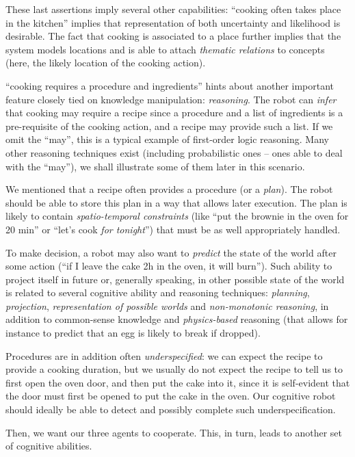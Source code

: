 These last assertions imply several other capabilities: ``cooking often takes
place in the kitchen'' implies that representation of both uncertainty and
likelihood is desirable. The fact that cooking is associated to a place further
implies that the system models locations and is able to attach \emph{thematic
relations} to concepts (here, the likely location of the cooking action).

``cooking requires a procedure and ingredients'' hints about another important
feature closely tied on knowledge manipulation: \emph{reasoning}. The robot can
\emph{infer} that cooking may require a recipe since a procedure and a list of
ingredients is a pre-requisite of the cooking action, and a recipe may provide
such a list.  If we omit the ``may'', this is a typical example of first-order
logic reasoning.  Many other reasoning techniques exist (including
probabilistic ones -- ones able to deal with the ``may''), we shall illustrate
some of them later in this scenario.

We mentioned that a recipe often provides a procedure (or a \emph{plan}). The
robot should be able to store this plan in a way that allows later execution.
The plan is likely to contain \emph{spatio-temporal constraints} (like ``put
the brownie in the oven for 20 min'' or ``let's cook \emph{for tonight}'') that
must be as well appropriately handled.

To make decision, a robot may also want to \emph{predict} the state of the
world after some action (``if I leave the cake 2h in the oven, it will burn'').
Such ability to project itself in future or, generally speaking, in other
possible state of the world is related to several cognitive ability and
reasoning techniques: \emph{planning}, \emph{projection}, \emph{representation
of possible worlds} and \emph{non-monotonic reasoning}, in addition to
common-sense knowledge and \emph{physics-based} reasoning (that allows for
instance to predict that an egg is likely to break if dropped).

Procedures are in addition often \emph{underspecified}: we can expect the
recipe to provide a cooking duration, but we usually do not expect the recipe
to tell us to first open the oven door, and then put the cake into it, since it
is self-evident that the door must first be opened to put the cake in the oven.
Our cognitive robot should ideally be able to detect and possibly complete such
underspecification.

Then, we want our three agents to cooperate. This, in turn, leads to another
set of cognitive abilities.

